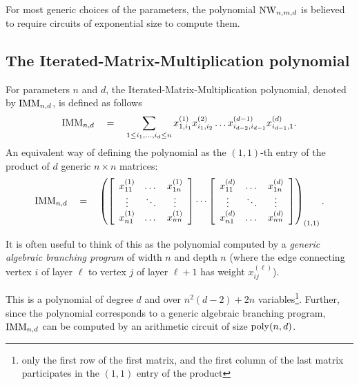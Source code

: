 For most generic choices of the parameters, the polynomial $\mathrm{NW}_{n,m,d}$ is believed to require circuits of exponential size to compute them. 

\subsection*{The Iterated-Matrix-Multiplication polynomial}

For parameters $n$ and $d$, the Iterated-Matrix-Multiplication polynomial, denoted by $\mathrm{IMM}_{n,d}$, is defined as follows
$$
\mathrm{IMM}_{n,d} \quad = \quad \sum_{1\leq i_1,\dots, i_d\leq n} x_{1,i_1}^{(1)}x_{i_1,i_2}^{(2)}\dots x_{i_{d-2},i_{d-1}}^{(d-1)}x_{i_{d-1},1}^{(d)}.
$$
An equivalent way of defining the polynomial as the $(1,1)$-th entry of the product of $d$ generic $n\times n$ matrices:
$$
\mathrm{IMM}_{n,d} \quad = \quad \left(\left[\begin{array}{ccc} x_{11}^{(1)} & \dots & x_{1n}^{(1)}\\ \vdots & \ddots & \vdots \\ x_{n1}^{(1)} & \dots & x_{nn}^{(1)}\end{array}\right] \cdots \left[\begin{array}{ccc} x_{11}^{(d)} & \dots & x_{1n}^{(d)}\\ \vdots & \ddots & \vdots \\ x_{n1}^{(d)} & \dots & x_{nn}^{(d)}\end{array}\right]\right)_{(1,1)}.
$$

It is often useful to think of this as the polynomial computed by a \emph{generic algebraic branching program} of width $n$ and depth $n$ (where the edge connecting vertex $i$ of layer $\ell$ to vertex $j$ of layer $\ell+1$ has weight $x_{ij}^{(\ell)}$). 

This is a polynomial of degree $d$ and over $n^2(d-2) + 2n$ variables\footnote{only the first row of the first matrix, and the first column of the last matrix participates in the $(1,1)$ entry of the product}. 
Further, since the polynomial corresponds to a generic algebraic branching program, $\mathrm{IMM}_{n,d}$ can be computed by an arithmetic circuit of size $\mathrm{poly}(n,d)$. 


